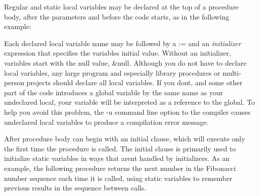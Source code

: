 Regular and static local variables may be declared at the top of a
procedure body, after the parameters and before the code starts, as in
the following example:


Each declared local variable name may be followed by a \textsf{:=} and
an \textit{initializer} expression that specifies the
variable{\textquotesingle}s initial value. Without an initializer,
variables start with the null value, \textsf{\&null}\textit{. }Although
you do not have to declare local variables, any large program and
especially library procedures or multi-person projects should declare
all local variables. If you don{\textquotesingle}t, and some other part
of the code introduces a global variable by the same name as your
undeclared local, your variable will be interpreted as a
reference to the global. To help you avoid this
problem, the \textsf{{}-u} command line option to the
compiler causes undeclared
local variables to produce a compilation error message.

After procedure body can begin with an \textsf{initial} clause, which will execute only the first time
the procedure is called. The \textsf{initial} clause is primarily used
to initialize static variables in ways that aren{\textquotesingle}t
handled by initializers. As an example, the following procedure returns
the next number in the Fibonacci number sequence each time it is
called, using static variables to remember previous results in the
sequence between calls.


